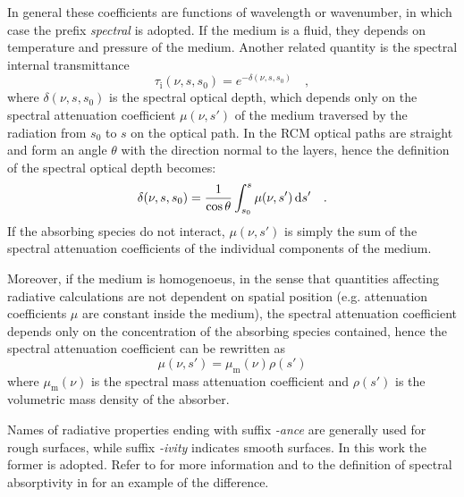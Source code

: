 \documentclass[a4paper,10pt,twocolumn,\classoptions]{article}
\begin{document}
In general these coefficients are functions of wavelength or wavenumber, in which case the prefix \emph{spectral} is adopted. If the medium is a fluid, they depends on temperature and pressure of the medium.
Another related quantity is the spectral internal transmittance
\begin{equation}
  \label{eq:spectral_internal_transmittance}
  \tau_\text{i}(\nu, s, s_0) = e^{-\delta(\nu, s, s_0)}
  \quad ,
\end{equation}
where $\delta(\nu, s, s_0)$ is the spectral optical depth, which depends only on the spectral attenuation coefficient $\mu(\nu, s')$ of the medium traversed by the radiation from $s_0$ to $s$ on the optical path. In the RCM optical paths are straight and form an angle $\theta$ with the direction normal to the layers, hence the definition of the spectral optical depth becomes:
\begin{equation}
  \label{eq:spectral_optical_depth}
  \delta(\nu, s, s_0) = \frac{1}{\cos \theta} \int_{s_0}^{s} \mu(\nu, s') \odif{s'}
  \quad .
\end{equation}
If the absorbing species do not interact, $\mu(\nu, s')$ is simply the sum of the spectral attenuation coefficients of the individual components of the medium.

Moreover, if the medium is homogenoeus, in the sense that quantities affecting radiative calculations are not dependent on spatial position (e.g. attenuation coefficients $\mu$ are constant inside the medium), the spectral attenuation coefficient depends only on the concentration of the absorbing species contained, hence the spectral attenuation coefficient can be rewritten as
\begin{equation}
  \label{eq:spectral_attenuation_coefficient}
  \mu(\nu, s') = \mu_\text{m}(\nu) \rho(s')
\end{equation}
where $\mu_\text{m}(\nu)$ is the spectral mass attenuation coefficient and $\rho(s')$ is the volumetric mass density of the absorber.

Names of radiative properties ending with suffix \emph{-ance} are generally used for rough surfaces, while suffix \emph{-ivity} indicates smooth surfaces. In this work the former is adopted. Refer to \cite[59]{Modest} for more information and to the definition of spectral absorptivity in \cite{CIE} for an example of the difference.
\end{document}
